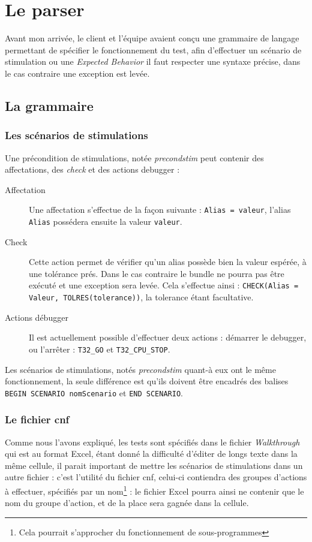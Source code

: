 	\section{Le parser}\label{sectionParser}
	Avant mon arrivée, le client et l'équipe avaient conçu une grammaire de langage permettant de spécifier le fonctionnement du test, afin d'effectuer un scénario de stimulation ou une \textit{Expected Behavior} il faut respecter une syntaxe précise, dans le cas contraire une exception est levée.

	\subsection{La grammaire}\label{specParser}
	\subsubsection{Les scénarios de stimulations}
	Une précondition de stimulations, notée \textit{precondstim} peut contenir des affectations, des \textit{check} et des actions debugger : 
	\begin{description}
		\item[Affectation] Une affectation s'effectue de la façon suivante : \texttt{Alias = valeur}, l'alias \texttt{Alias} possédera ensuite la valeur \texttt{valeur}.
		\item[Check] Cette action permet de vérifier qu'un alias possède bien la valeur espérée, à une tolérance prés. Dans le cas contraire le bundle ne pourra pas être exécuté et une exception sera levée. Cela s'effectue ainsi : \texttt{CHECK(Alias = Valeur, TOLRES(tolerance))}, la tolerance étant facultative.
		\item[Actions débugger] Il est actuellement possible d'effectuer deux actions : démarrer le debugger, ou l'arrêter : \texttt{T32\_GO} et 
		\texttt{T32\_CPU\_STOP}.
	\end{description}

	Les scénarios de stimulations, notés \textit{precondstim} quant-à eux ont le même fonctionnement, la seule différence est qu'ils doivent être encadrés des balises \texttt{BEGIN SCENARIO nomScenario} et \texttt{END SCENARIO}.

	\subsubsection{Le fichier cnf}
	Comme nous l'avons expliqué, les tests sont spécifiés dans le fichier \textit{Walkthrough} qui est au format Excel, étant donné la difficulté d'éditer de longs texte dans la même cellule, il parait important de mettre les scénarios de stimulations dans un autre fichier : c'est l'utilité du fichier cnf, celui-ci contiendra des groupes d'actions à effectuer, spécifiés par un nom\footnote{Cela pourrait s'approcher du fonctionnement de sous-programmes} : le fichier Excel pourra ainsi ne contenir que le nom du groupe d'action, et de la place sera gagnée dans la cellule.

